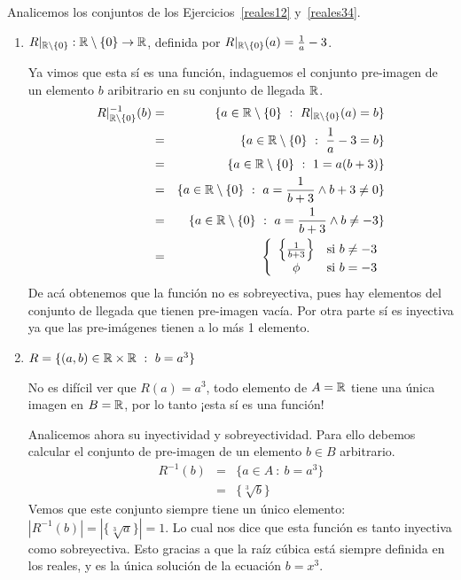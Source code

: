 \begin{ejemplo}
  Analicemos los conjuntos de los Ejercicios~\ref{reales12} y~\ref{reales34}.
\begin{enumerate}
\item[2)] $R|_{\mathbb{R}\setminus\{0\}}:\mathbb{R}\setminus\{0\}\rightarrow \mathbb{R}$, definida por $ R|_{\mathbb{R}\setminus\{0\}}(a)=\frac{1}{a}-3$.

Ya vimos que esta sí es una función, indaguemos el conjunto pre-imagen de un elemento $b$ aribitrario en su conjunto de llegada $\mathbb{R}$.
\begin{eqnarray*}
R|_{\R\setminus\{0\}}^{-1}(b)&=&\{ a\in {\R\setminus\{0\}}\ :\ R|_{\R\setminus\{0\}}(a)=b\}\\
&=&\{ a\in {\R\setminus\{0\}}\ :\ \frac{1}{a}-3=b\}\\
&=&\{ a\in {\R\setminus\{0\}}\ :\ 1=a(b+3)\}\\
&=&\{ a\in {\R\setminus\{0\}}\ :\ a=\frac{1}{b+3}\wedge b+3\not = 0\}\\
&=&\{ a\in {\R\setminus\{0\}}\ :\ a=\frac{1}{b+3}\wedge b\not = -3\}\\
&=&\left\{ \begin{array}{cl} \left\{\frac{1}{b+3}\right\} & \textrm{si } b\not = -3\\ \phi & \textrm{si } b=-3\end{array}\right.
\end{eqnarray*}
De acá obtenemos que la función no es sobreyectiva, pues hay elementos del conjunto de llegada que tienen pre-imagen vacía.
Por otra parte sí es inyectiva ya que las pre-imágenes tienen a lo más 1 elemento.
 \item[3)] $R=\{ (a,b)\in\R\times\R\ :\ b=a^3\}$

    No es difícil ver que $R(a)=a^3$, todo elemento de $A=\mathbb{R}$ tiene una única imagen en $B=\mathbb{R}$, por lo tanto ¡esta sí es una función!

    Analicemos ahora su inyectividad y sobreyectividad.
    Para ello debemos calcular el conjunto de pre-imagen de un elemento $b\in B$ arbitrario.
    \begin{eqnarray*}
      R^{-1}(b)&=& \{a\in A\ :\ b=a^3\}\\
      &=& \{\sqrt[3]{b}\}
    \end{eqnarray*}
    Vemos que este conjunto siempre tiene un único elemento: $|R^{-1}(b)|=|\{\sqrt[3]{a}\}|=1$.
    Lo cual nos dice que esta función es tanto inyectiva como sobreyectiva.
    Esto gracias a que la raíz cúbica está siempre definida en los reales, y es la única solución de la ecuación $b=x^3$.


\end{enumerate}
\end{ejemplo}
